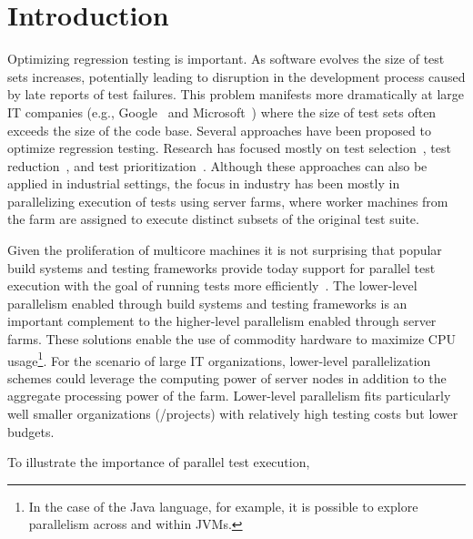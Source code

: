 \section{Introduction}

Optimizing regression testing is important.  As software evolves the
size of test sets increases, potentially leading to disruption in the
development process caused by late reports of test failures.  This
problem manifests more dramatically at large IT companies
(e.g., Google~ and
Microsoft~) where the size of test sets often exceeds the
size of the code base.  Several approaches have been proposed to
optimize regression testing.  Research has focused mostly on test
selection~, test reduction~, and test
prioritization~.  Although these approaches can also be
applied in industrial settings, the focus in industry has been mostly
in parallelizing execution of tests using server farms, where worker machines from the
farm are assigned to execute distinct subsets of the original test
suite.

Given the proliferation of multicore machines it is not surprising
that popular build systems and testing frameworks provide today
support for parallel test execution with the goal of running tests
more efficiently~\cite{junit-org,testng,nunit,maven-surefire-plugin}.
The lower-level parallelism enabled through build systems and testing
frameworks is an important complement to the higher-level parallelism
enabled through server farms.  These solutions enable the use of
commodity hardware to maximize CPU usage\footnote{In the case of the
Java language, for example, it is possible to explore parallelism
across and within JVMs.}.  For the scenario of large IT organizations,
lower-level parallelization schemes could leverage the computing power
of server nodes in addition to the aggregate processing power of the
farm.  Lower-level parallelism fits particularly well smaller
organizations (/projects) with relatively high testing costs but lower
budgets.  

To illustrate the importance of parallel test execution, 

